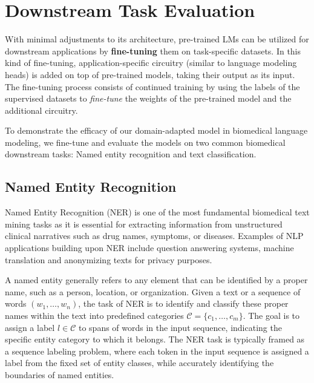 \section{Downstream Task Evaluation} \label{sec:fine-tuning}

With minimal adjustments to its architecture, pre-trained LMs can be utilized
for downstream applications by \textbf{fine-tuning} them on task-specific
datasets. In this kind of fine-tuning, application-specific circuitry (similar
to language modeling heads) is added on top of pre-trained models, taking their
output as its input. The fine-tuning process consists of continued training by
using the labels of the supervised datasets to \textit{fine-tune} the weights of
the pre-trained model and the additional circuitry.

To demonstrate the efficacy of our domain-adapted model in biomedical language
modeling, we fine-tune and evaluate the \ChristBERT{} models on two common
biomedical downstream tasks: Named entity recognition and text classification.

\subsection{Named Entity Recognition}

Named Entity Recognition (NER) is one of the most fundamental biomedical text
mining tasks as it is essential for extracting information from unstructured
clinical narratives such as drug names, symptoms, or diseases. Examples of NLP
applications building upon NER include question answering systems, machine
translation and anonymizing texts for privacy purposes.

A named entity generally refers to any element that can be identified by a
proper name, such as a person, location, or organization. Given a text or a
sequence of words $(w_1, \ldots, w_n)$, the task of NER is to identify and
classify these proper names within the text into predefined categories
$\mathcal{C} = \{c_1, \ldots, c_m\}$. The goal is to assign a label $l \in
\mathcal{C}$ to spans of words in the input sequence, indicating the specific
entity category to which it belongs. The NER task is typically framed as a
sequence labeling problem, where each token in the input sequence is assigned a
label from the fixed set of entity classes, while accurately identifying the
boundaries of named entities.


